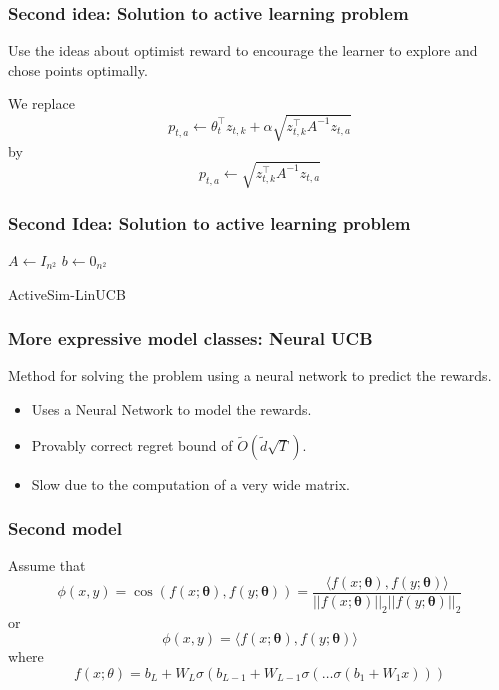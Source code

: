 \documentclass{beamer}
\begin{document}
\begin{frame}{}
    \frametitle{Second idea: Solution to active learning problem}
    Use the ideas about optimist reward to encourage the learner to explore and chose points
    optimally.

    We replace
    \[ p_{t,a} \gets \theta_t^\top z_{t,k} + \alpha \sqrt{z_{t,k}^\top A^{-1} z_{t,a}} \]
    by
    \[ p_{t,a} \gets \sqrt{z_{t,k}^\top A^{-1} z_{t,a}} \]
\end{frame}

\begin{frame}{}
    \frametitle{Second Idea: Solution to active learning problem}
    {\small
    \begin{algorithm}[H]
          $A \gets I_{n^2}$\;
          $b \gets 0_{n^2}$\;
          \caption{ActiveSim-LinUCB}
      \end{algorithm}
    }
\end{frame}


\begin{frame}{}
    \frametitle{More expressive model classes: Neural UCB}
    Method for solving the problem using a neural network to predict the rewards.
    \begin{itemize}
        \item Uses a Neural Network to model the rewards.
        \item Provably correct regret bound of $\tilde{O}(\tilde{d}\sqrt{T})$.
        \item Slow due to the computation of a very wide matrix.
    \end{itemize}
\end{frame}


\begin{frame}{}
    \frametitle{Second model}
    Assume that
    \[ \phi(x,y) = \cos\left(f(x;\mathbf{\theta}), f(y;\mathbf{\theta})\right) = \frac{\langle f(x;\mathbf{\theta}), f(y;\mathbf{\theta}) \rangle}{||f(x;\mathbf{\theta})||_2 ||f(y;\mathbf{\theta})||_2}\]
    or
    \[ \phi(x,y) = \langle f(x;\mathbf{\theta}), f(y;\mathbf{\theta}) \rangle \]
    where
    \[ f(x; \theta) = b_L + W_{L} \sigma\left(b_{L-1} +  W_{L-1} \sigma\left( \dots \sigma\left(b_1 + W_1 x\right)\right) \right)\]

    \vspace{1cm}
\end{frame}
\end{document}
